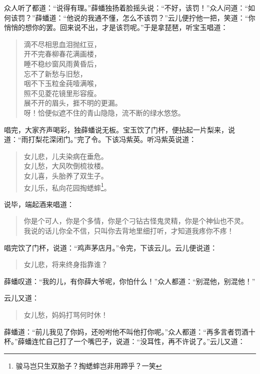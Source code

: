\documentclass[12pt,oneside]{book}
\newenvironment{shici}{%
\begin{verse}%
\centering\large\hspace{12pt}}%
{\end{verse}}
\begin{document}
众人听了都道：“说得有理。”薛蟠独扬着脸摇头说：“不好，该罚！”众人问道：“如何该罚？”薛蟠道：“他说的我通不懂，怎么不该罚？”云儿便拧他一把，笑道：“你悄悄的想你的罢。回来说不出，才是该罚呢。”于是拿琵琶，听宝玉唱道：

\begin{shici}
滴不尽相思血泪抛红豆，\\
开不完春柳春花满画楼，\\
睡不稳纱窗风雨黄昏后，\\
忘不了新愁与旧愁，\\
咽不下玉粒金莼噎满喉，\\
照不见菱花镜里形容瘦。\\
展不开的眉头，捱不明的更漏。\\
呀！恰便似遮不住的青山隐隐，流不断的绿水悠悠。
\end{shici}


唱完，大家齐声喝彩，独薛蟠说无板。宝玉饮了门杯，便拈起一片梨来，说道：“雨打梨花深闭门。”完了令。下该冯紫英。听冯紫英说道：

\begin{shici}
女儿悲，儿夫染病在垂危。\\
女儿愁，大风吹倒梳妆楼。\\
女儿喜，头胎养了双生子。\\
女儿乐，私向花园掏蟋蟀\footnote{骏马岂只生双胎子？掏蟋蟀岂非用蹄乎？一笑}。

\end{shici}

说毕，端起酒来唱道：

\begin{shici}
你是个可人，你是个多情，你是个刁钻古怪鬼灵精，你是个神仙也不灵。\\
我说的话儿你全不信，只叫你去背地里细打听，才知道我疼你不疼！
\end{shici}

唱完饮了门杯，说道：“鸡声茅店月。”令完，下该云儿。云儿便说道：

\begin{shici}
女儿悲，将来终身指靠谁？
\end{shici}

薛蟠叹道：“我的儿，有你薛大爷呢，你怕什么！”众人都道：“别混他，别混他！”

云儿又道：

\begin{shici}
女儿愁，妈妈打骂何时休！
\end{shici}

薛蟠道：“前儿我见了你妈，还吩咐他不叫他打你呢。”众人都道：“再多言者罚酒十杯。”薛蟠连忙自己打了一个嘴巴子，说道：“没耳性，再不许说了。”云儿又道：
\end{document}
